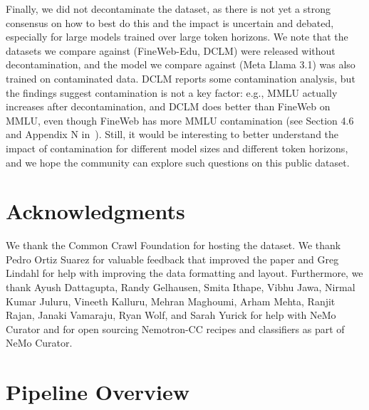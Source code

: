 \documentclass[11pt]{article}
\begin{document}
Finally, we did not decontaminate the dataset, as there is not yet a strong consensus on how to best do this and the impact is uncertain and debated, especially for large models trained over large token horizons. We note that the datasets we compare against (FineWeb-Edu, DCLM) were released without decontamination, and the model we compare against (Meta Llama 3.1) was also trained on contaminated data. DCLM reports some contamination analysis, but the findings suggest contamination is not a key factor: e.g., MMLU actually increases after decontamination, and DCLM does better than FineWeb on MMLU, even though FineWeb has more MMLU contamination (see Section 4.6 and Appendix N in~\citet{li2024datacomp}). Still, it would be interesting to better understand the impact of contamination for different model sizes and different token horizons, and we hope the community can explore such questions on this public dataset.

\section*{Acknowledgments}
We thank the Common Crawl Foundation for hosting the dataset. We thank Pedro Ortiz Suarez for valuable feedback that improved the paper and Greg Lindahl for help with improving the data formatting and layout. Furthermore, we thank Ayush Dattagupta, Randy Gelhausen, Smita Ithape, Vibhu Jawa, Nirmal Kumar Juluru, Vineeth Kalluru, Mehran Maghoumi, Arham Mehta, Ranjit Rajan, Janaki Vamaraju, Ryan Wolf, and Sarah Yurick for help with NeMo Curator and for open sourcing Nemotron-CC recipes and classifiers as part of NeMo Curator.



\newpage

\appendix

\section{Pipeline Overview}
\label{appendix:pipelineoverview}
\end{document}
